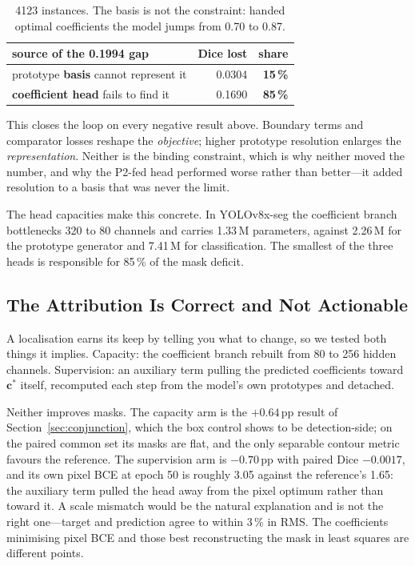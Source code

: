 \documentclass[10pt,twocolumn,letterpaper]{article}
\begin{document}
\begin{table}[h]
\centering\small
\begin{tabular}{lrr}
\toprule
source of the 0.1994 gap & Dice lost & share \\
\midrule
prototype \textbf{basis} cannot represent it & 0.0304 & \textbf{15\,\%} \\
\textbf{coefficient head} fails to find it & 0.1690 & \textbf{85\,\%} \\
\bottomrule
\end{tabular}
\caption{4123 instances. The basis is not the constraint: handed optimal
coefficients the model jumps from 0.70 to 0.87.}
\end{table}

This closes the loop on every negative result above. Boundary terms and
comparator losses reshape the \emph{objective}; higher prototype resolution
enlarges the \emph{representation}. Neither is the binding constraint, which is
why neither moved the number, and why the P2-fed head performed worse rather
than better---it added resolution to a basis that was never the limit.

The head capacities make this concrete. In YOLOv8x-seg the coefficient branch
bottlenecks 320 to 80 channels and carries 1.33\,M parameters, against 2.26\,M
for the prototype generator and 7.41\,M for classification. The smallest of the
three heads is responsible for 85\,\% of the mask deficit.

\subsection{The Attribution Is Correct and Not Actionable}

A localisation earns its keep by telling you what to change, so we tested both
things it implies. Capacity: the coefficient branch rebuilt from 80 to 256
hidden channels. Supervision: an auxiliary term pulling the predicted
coefficients toward $\mathbf{c}^{*}$ itself, recomputed each step from the
model's own prototypes and detached.

Neither improves masks. The capacity arm is the $+0.64$\,pp result of
Section~\ref{sec:conjunction}, which the box control shows to be
detection-side; on the paired common set its masks are flat, and the only
separable contour metric favours the reference. The supervision arm is
$-0.70$\,pp with paired Dice $-0.0017$, and its own pixel BCE at epoch 50 is
roughly 3.05 against the reference's 1.65: the auxiliary term pulled the head
away from the pixel optimum rather than toward it. A scale mismatch would be the
natural explanation and is not the right one---target and prediction agree to
within 3\,\% in RMS. The coefficients minimising pixel BCE and those best
reconstructing the mask in least squares are different points.
\end{document}
